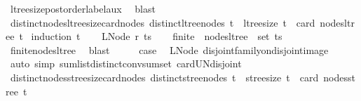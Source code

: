 \begin{isabellebody}
\ ltree{\isacharunderscore}{\kern0pt}size{\isacharunderscore}{\kern0pt}postorder{\isacharunderscore}{\kern0pt}label{\isacharunderscore}{\kern0pt}aux\ \isamarkupfalse%
\ blast%
\endisatagproof
{\isafoldproof}%
%
\isadelimproof
\isanewline
%
\endisadelimproof
\isanewline
{}\isamarkupfalse%
\ distinct{\isacharunderscore}{\kern0pt}nodes{\isacharunderscore}{\kern0pt}ltree{\isacharunderscore}{\kern0pt}size{\isacharunderscore}{\kern0pt}card{\isacharunderscore}{\kern0pt}nodes{\isacharcolon}{\kern0pt}\ {\isachardoublequoteopen}distinct{\isacharunderscore}{\kern0pt}ltree{\isacharunderscore}{\kern0pt}nodes\ t\ {\isasymLongrightarrow}\ ltree{\isacharunderscore}{\kern0pt}size\ t\ {\isacharequal}{\kern0pt}\ card\ {\isacharparenleft}{\kern0pt}nodes{\isacharunderscore}{\kern0pt}ltree\ t{\isacharparenright}{\kern0pt}{\isachardoublequoteclose}\isanewline
%
\isadelimproof
%
\endisadelimproof
%
\isatagproof
{}\isamarkupfalse%
\ {\isacharparenleft}{\kern0pt}induction\ t{\isacharparenright}{\kern0pt}\isanewline
\ \ \isamarkupfalse%
\ {\isacharparenleft}{\kern0pt}LNode\ r\ ts{\isacharparenright}{\kern0pt}\isanewline
\ \ \isamarkupfalse%
\ {\isachardoublequoteopen}finite\ {\isacharparenleft}{\kern0pt}{\isasymUnion}\ {\isacharparenleft}{\kern0pt}nodes{\isacharunderscore}{\kern0pt}ltree\ {\isacharbackquote}{\kern0pt}\ set\ ts{\isacharparenright}{\kern0pt}{\isacharparenright}{\kern0pt}{\isachardoublequoteclose}\ \isamarkupfalse%
\ finite{\isacharunderscore}{\kern0pt}nodes{\isacharunderscore}{\kern0pt}ltree\ \isamarkupfalse%
\ blast\isanewline
\ \ \isamarkupfalse%
\ \isamarkupfalse%
\ {\isacharquery}{\kern0pt}case\ \isamarkupfalse%
\ LNode\ disjoint{\isacharunderscore}{\kern0pt}family{\isacharunderscore}{\kern0pt}on{\isacharunderscore}{\kern0pt}disjoint{\isacharunderscore}{\kern0pt}image\isanewline
\ \ \ \ \isamarkupfalse%
\ {\isacharparenleft}{\kern0pt}auto\ simp{\isacharcolon}{\kern0pt}\ sum{\isacharunderscore}{\kern0pt}list{\isacharunderscore}{\kern0pt}distinct{\isacharunderscore}{\kern0pt}conv{\isacharunderscore}{\kern0pt}sum{\isacharunderscore}{\kern0pt}set\ card{\isacharunderscore}{\kern0pt}UN{\isacharunderscore}{\kern0pt}disjoint{\isacharprime}{\kern0pt}{\isacharparenright}{\kern0pt}\isanewline
{}\isamarkupfalse%
%
\endisatagproof
{\isafoldproof}%
%
\isadelimproof
\isanewline
%
\endisadelimproof
\isanewline
{}\isamarkupfalse%
\ distinct{\isacharunderscore}{\kern0pt}nodes{\isacharunderscore}{\kern0pt}stree{\isacharunderscore}{\kern0pt}size{\isacharunderscore}{\kern0pt}card{\isacharunderscore}{\kern0pt}nodes{\isacharcolon}{\kern0pt}\ {\isachardoublequoteopen}distinct{\isacharunderscore}{\kern0pt}stree{\isacharunderscore}{\kern0pt}nodes\ t\ {\isasymLongrightarrow}\ stree{\isacharunderscore}{\kern0pt}size\ t\ {\isacharequal}{\kern0pt}\ card\ {\isacharparenleft}{\kern0pt}nodes{\isacharunderscore}{\kern0pt}stree\ t{\isacharparenright}{\kern0pt}{\isachardoublequoteclose}\isanewline

\end{isabellebody}
